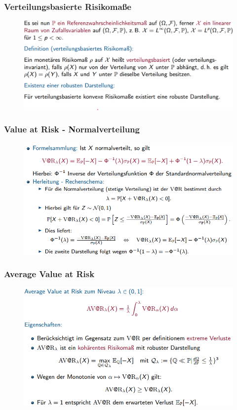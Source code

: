 \documentclass[12pt]{report}
\theoremstyle{dotless}
\theoremstyle{definition}
\begin{document}
\subsubsection{Verteilungsbasierte Risikomaße}

\begin{figure}[ht]
	\centering
	\includegraphics[width=0.9 \textwidth]{Bilder/verteilungsbasiert.png}
\end{figure}

\subsubsection{Value at Risk - Normalverteilung}

\begin{figure}[ht]
	\centering
	\includegraphics[width=0.9 \textwidth]{Bilder/VaR_Normal.png}
\end{figure}


\subsubsection{Average Value at Risk}
\begin{figure}[ht]
	\centering
	\includegraphics[width=0.9 \textwidth]{Bilder/AVaR.png}
\end{figure}
\end{document}
